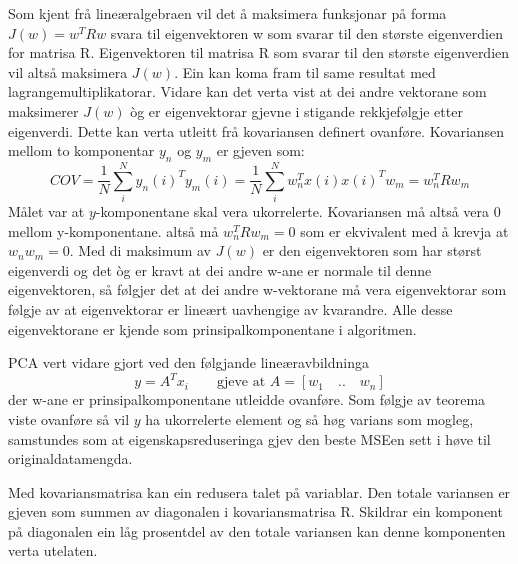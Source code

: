 \documentclass[oneside, nynorsk]{book}
\begin{document}
Som kjent frå lineæralgebraen vil det å maksimera funksjonar på forma $J(w)=w^TRw$ svara til eigenvektoren w som svarar til den største eigenverdien for matrisa R.
Eigenvektoren til matrisa R som svarar til den største eigenverdien vil altså maksimera $J(w)$. Ein kan koma fram til same resultat med lagrangemultiplikatorar.
Vidare kan det verta vist at dei andre vektorane som maksimerer $J(w)$ òg er eigenvektorar gjevne i stigande rekkjefølgje etter eigenverdi.
Dette kan verta utleitt frå kovariansen definert ovanføre.
Kovariansen mellom to komponentar $y_n$ og $y_m$ er gjeven som:
\[COV=\frac{1}{N}\sum_{i}^Ny_n(i)^Ty_m(i)=\frac{1}{N}\sum_{i}^Nw_n^Tx(i)x(i)^Tw_m=w_n^TRw_m\]
Målet var at $y$-komponentane skal vera ukorrelerte. Kovariansen må altså vera 0 mellom y-komponentane. altså må $w_n^TRw_m=0$ som er ekvivalent med å krevja at
$w_nw_m=0$. Med di maksimum av $J(w)$ er den eigenvektoren som har størst eigenverdi og det òg er kravt at dei andre w-ane er normale til denne eigenvektoren, så følgjer det at
dei andre w-vektorane må vera eigenvektorar som følgje av at eigenvektorar er lineært uavhengige av kvarandre.
Alle desse eigenvektorane er kjende som prinsipalkomponentane i algoritmen.

PCA vert vidare gjort ved den følgjande lineæravbildninga
\[y=A^Tx_i \qquad \text{gjeve at $A=[w_1 \quad .. \quad w_n]$}\]
der w-ane er prinsipalkomponentane utleidde ovanføre.
Som følgje av teorema viste ovanføre så vil $y$ ha ukorrelerte element og så høg varians som mogleg,
samstundes som at eigenskapsreduseringa gjev den beste MSEen sett i høve til originaldatamengda.

Med kovariansmatrisa kan ein redusera talet på variablar. Den totale variansen er gjeven som summen av diagonalen i kovariansmatrisa R.
Skildrar ein komponent på diagonalen ein låg prosentdel av den totale variansen kan denne komponenten verta utelaten.

\end{document}
